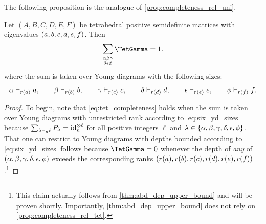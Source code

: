 \documentclass[notitlepage, 10pt]{article}
\begin{document}
The following proposition is the analogue of \cref{prop:completeness_rel_uni}.
\begin{prop}
    \label{prop:completeness_rel_tet}
    Let $(A,B,C,D,E,F)$ be tetrahedral positive semidefinite matrices with eigenvalues $(a,b,c,d,e,f)$.
    Then
    \begin{align}
        \label{eq:tet_completeness}
        \sum_{\substack{\ya \yb \yc \\ \yd \ye \yf}}
        \TetGamma = 1.
    \end{align}
    where the sum is taken over Young diagrams with the following sizes:
    \begin{equation}
        \label{eq:six_yd_sizes_rank}
        \alpha \vdash_{r(a)} a, \qquad 
        \beta \vdash_{r(b)} b, \qquad
        \gamma \vdash_{r(c)} c, \qquad
        \delta \vdash_{r(d)} d, \qquad
        \epsilon \vdash_{r(e)} e, \qquad
        \phi \vdash_{r(f)} f.
    \end{equation}
\end{prop}
\begin{proof}
    To begin, note that \cref{eq:tet_completeness} holds when the sum is taken over Young diagrams with unrestricted rank according to \cref{eq:six_yd_sizes} because $\sum_{\lambda \vdash_n \ell} P_{\lambda} = \operatorname{id}_{n}^{\otimes \ell}$ for all positive integers $\ell$ and $\lambda \in \{\alpha, \beta, \gamma, \delta, \epsilon, \phi\}$.
    That one can restrict to Young diagrams with depths bounded according to \cref{eq:six_yd_sizes} follows
    because $\TetGamma = 0$ whenever the depth of \textit{any} of $(\alpha, \beta, \gamma, \delta, \epsilon, \phi)$ exceeds the corresponding ranks $(r(a), r(b), r(c), r(d), r(e), r(f))$.\footnote{This claim actually follows from \cref{thm:abd_dep_upper_bound} and will be proven shortly. Importantly, \cref{thm:abd_dep_upper_bound} does not rely on \cref{prop:completeness_rel_tet}.}
\end{proof}
\end{document}

